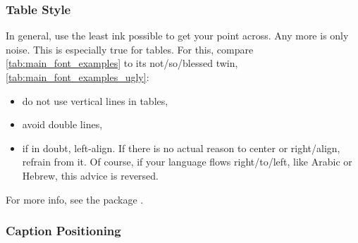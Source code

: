 \subsubsection{Table Style}

In general, use the least ink possible to get your point across.
Any more is only noise.
This is especially true for tables.
For this, compare \cref{tab:main_font_examples} to its not\-/so\-/blessed
twin, \cref{tab:main_font_examples_ugly}:
\begin{itemize}
    \item do not use vertical lines in tables,
    \item avoid double lines,
    \item if in doubt, left-align.
        If there is no actual reason to center or right\-/align, refrain from it.
        Of course, if your language flows right\-/to\-/left, like Arabic or Hebrew,
        this advice is reversed.
\end{itemize}
For more info, see the package .

\begin{table}
\end{table}

\subsubsection{Caption Positioning}

